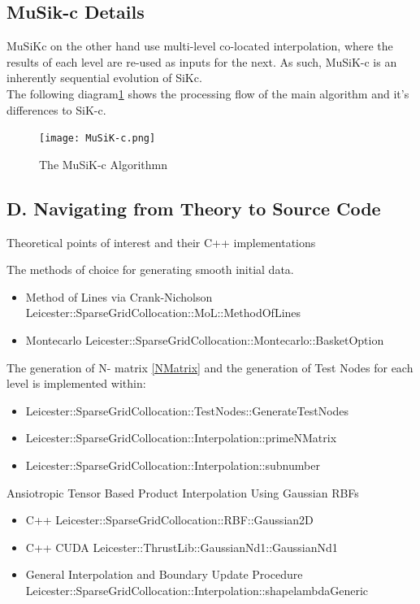 \documentclass[a4paper]{amsart}
\begin{document}
\newpage
\subsection{MuSik-c Details} \label{appMuSiK}
MuSiKc on the other hand use multi-level co-located interpolation, where the results of each level are re-used as inputs for the next. As such, MuSiK-c is an inherently sequential evolution of SiKc.\\
 The following diagram\ref{fig:musikc1} shows the processing flow of the main algorithm and it's differences to SiK-c.\\

\begin{figure}[h]
\centering
\texttt{[image: MuSiK-c.png]}
\caption {The MuSiK-c Algorithmn}
\label {fig:musikc1}
\end{figure}


\subsection{D. Navigating from Theory to Source Code}
Theoretical points of interest and their C++ implementations

The methods of choice for generating smooth initial data.
\begin{itemize}
\item Method of Lines via Crank-Nicholson Leicester::SparseGridCollocation::MoL::MethodOfLines
\item Montecarlo Leicester::SparseGridCollocation::Montecarlo::BasketOption
\end{itemize}

The generation of N- matrix \ref{NMatrix} and the generation of Test Nodes for each level is implemented within:
\begin{itemize}
\item Leicester::SparseGridCollocation::TestNodes::GenerateTestNodes
\item Leicester::SparseGridCollocation::Interpolation::primeNMatrix
\item Leicester::SparseGridCollocation::Interpolation::subnumber
\end{itemize}

Ansiotropic Tensor Based Product Interpolation Using Gaussian RBFs
\begin{itemize}
\item C++ Leicester::SparseGridCollocation::RBF::Gaussian2D
\item C++ CUDA  Leicester::ThrustLib::GaussianNd1::GaussianNd1
\item General Interpolation and Boundary Update Procedure Leicester::SparseGridCollocation::Interpolation::shapelambdaGeneric
\end{itemize}
\end{document}
